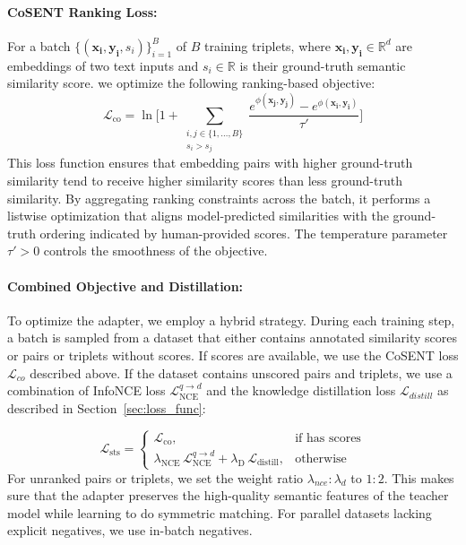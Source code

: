 \documentclass[11pt]{article}
\begin{document}
\paragraph{CoSENT Ranking Loss:}
For a batch $\{(\bm{x_i}, \bm{y_i}, s_i)\}_{i=1}^B$ of $B$ training triplets, where $\bm{x_i}, \bm{y_i} \in \mathbb{R}^d$ are embeddings of two text inputs and $s_i \in \mathbb{R}$ is their ground-truth semantic similarity score. we optimize the following ranking-based objective:
\begin{equation}
\label{eq:cosentloss}
    \mathcal{L}_{\mathrm{co}} =
    \ln\!\Bigg[
        1 +
        \sum_{\substack{i,j \in \{1,\dots,B\} \\ s_i > s_j}}
        \frac{
        e^{\phi(\bm{x_j}, \bm{y_j})} -
        e^{\phi(\bm{x_i}, \bm{y_i})}
        }{\tau'}
    \Bigg]
\end{equation}
This loss function ensures that embedding pairs with higher ground-truth similarity tend to receive higher similarity scores than less ground-truth similarity. By aggregating ranking constraints across the batch, it performs a listwise optimization that aligns model-predicted similarities with the ground-truth ordering indicated by human-provided scores. The temperature parameter $\tau' > 0$ controls the smoothness of the objective.

\paragraph{Combined Objective and Distillation:}
To optimize the adapter, we employ a hybrid strategy. 
During each training step, a batch is sampled from a dataset that either contains annotated similarity scores or pairs or triplets without scores. If scores are available, we use the CoSENT loss $\mathcal{L}_{co}$ described above. If the dataset contains unscored pairs and triplets, we use a combination of InfoNCE loss $\mathcal{L}_{\text{NCE}}^{q \rightarrow d}$ and the knowledge distillation loss $\mathcal{L}_{distill}$ as described in Section~\ref{sec:loss_func}:

\begin{equation}
\label{eq:sts_total_loss}
\mathcal{L}_{\text{sts}} =
\begin{cases}
\mathcal{L}_{\text{co}}, 
& \text{if has scores} \\[6pt]
\lambda_{\text{NCE}}\,\mathcal{L}_{\text{NCE}}^{q \rightarrow d}
+ \lambda_{\text{D}}\,\mathcal{L}_{\text{distill}},
& \text{otherwise}
\end{cases}
\end{equation}
For unranked pairs or triplets, we set the weight ratio $\lambda_{nce}:\lambda_{d}$ to $1:2$. This makes sure that the adapter preserves the high-quality semantic features of the teacher model while learning to do symmetric matching. 
For parallel datasets lacking explicit negatives, we use in-batch negatives. 
\end{document}
